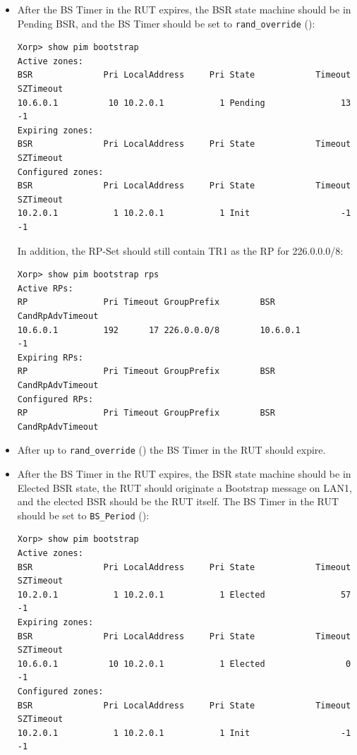 \documentclass[11pt]{report}
\begin{document}
\begin{itemize}
  \item After the BS Timer in the RUT expires, the BSR state machine should be
  in Pending BSR, and the BS Timer should be set to \verb=rand_override=
  ({\PimsmRandOverride}):

\begin{verbatim}
Xorp> show pim bootstrap 
Active zones:
BSR              Pri LocalAddress     Pri State            Timeout SZTimeout
10.6.0.1          10 10.2.0.1           1 Pending               13        -1
Expiring zones:
BSR              Pri LocalAddress     Pri State            Timeout SZTimeout
Configured zones:
BSR              Pri LocalAddress     Pri State            Timeout SZTimeout
10.2.0.1           1 10.2.0.1           1 Init                  -1        -1
\end{verbatim}

  In addition, the RP-Set should still contain TR1 as the RP for 226.0.0.0/8:

\begin{verbatim}
Xorp> show pim bootstrap rps 
Active RPs:
RP               Pri Timeout GroupPrefix        BSR         CandRpAdvTimeout
10.6.0.1         192      17 226.0.0.0/8        10.6.0.1                  -1
Expiring RPs:
RP               Pri Timeout GroupPrefix        BSR         CandRpAdvTimeout
Configured RPs:
RP               Pri Timeout GroupPrefix        BSR         CandRpAdvTimeout
\end{verbatim}

  \item After up to \verb=rand_override= ({\PimsmRandOverride}) the BS Timer
  in the RUT should expire.

  \item After the BS Timer in the RUT expires, the BSR state machine should be
  in Elected BSR state, the RUT should originate a Bootstrap message on LAN1,
  and the elected BSR should be the RUT itself.
  The BS Timer in the RUT should be set to \verb=BS_Period=
  ({\PimsmBSPeriod}):

\begin{verbatim}
Xorp> show pim bootstrap 
Active zones:
BSR              Pri LocalAddress     Pri State            Timeout SZTimeout
10.2.0.1           1 10.2.0.1           1 Elected               57        -1
Expiring zones:
BSR              Pri LocalAddress     Pri State            Timeout SZTimeout
10.6.0.1          10 10.2.0.1           1 Elected                0        -1
Configured zones:
BSR              Pri LocalAddress     Pri State            Timeout SZTimeout
10.2.0.1           1 10.2.0.1           1 Init                  -1        -1
\end{verbatim}


\end{itemize}
\end{document}
